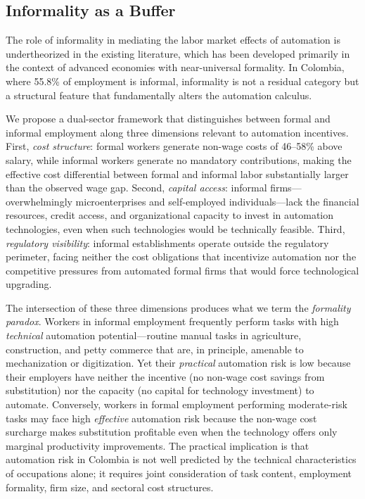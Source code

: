 \subsection{Informality as a Buffer}
\label{subsec:informality_theory}

The role of informality in mediating the labor market effects of automation is undertheorized in the existing literature, which has been developed primarily in the context of advanced economies with near-universal formality. In Colombia, where 55.8\% of employment is informal, informality is not a residual category but a structural feature that fundamentally alters the automation calculus.

We propose a dual-sector framework that distinguishes between formal and informal employment along three dimensions relevant to automation incentives. First, \textit{cost structure}: formal workers generate non-wage costs of 46--58\% above salary, while informal workers generate no mandatory contributions, making the effective cost differential between formal and informal labor substantially larger than the observed wage gap. Second, \textit{capital access}: informal firms---overwhelmingly microenterprises and self-employed individuals---lack the financial resources, credit access, and organizational capacity to invest in automation technologies, even when such technologies would be technically feasible. Third, \textit{regulatory visibility}: informal establishments operate outside the regulatory perimeter, facing neither the cost obligations that incentivize automation nor the competitive pressures from automated formal firms that would force technological upgrading.

The intersection of these three dimensions produces what we term the \textit{formality paradox}. Workers in informal employment frequently perform tasks with high \textit{technical} automation potential---routine manual tasks in agriculture, construction, and petty commerce that are, in principle, amenable to mechanization or digitization. Yet their \textit{practical} automation risk is low because their employers have neither the incentive (no non-wage cost savings from substitution) nor the capacity (no capital for technology investment) to automate. Conversely, workers in formal employment performing moderate-risk tasks may face high \textit{effective} automation risk because the non-wage cost surcharge makes substitution profitable even when the technology offers only marginal productivity improvements. The practical implication is that automation risk in Colombia is not well predicted by the technical characteristics of occupations alone; it requires joint consideration of task content, employment formality, firm size, and sectoral cost structures.

